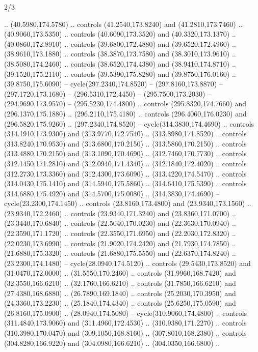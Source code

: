 \begin{flagdescription}{2/3}
\begin{scope}[xshift=0.5\flaglength,yshift=0.5\flagwidth,scale=\stretchfactor]
\begin{scope}[scale=0.001645\flagwidth,yshift=65mm,xshift=-63mm]
\begin{scope}[y=0.80pt, x=0.80pt, yscale=-1,]
\begin{scope}[cm={{1.33333,0.0,0.0,1.33333,(0.0,1e-05)}}]
  .. (40.5980,174.5780) .. controls (41.2540,173.8240) and (41.2810,173.7460) ..
  (40.9060,173.5350) .. controls (40.6090,173.3520) and (40.3320,173.1370) ..
  (40.0860,172.8910) .. controls (39.6800,172.4880) and (39.6520,172.4960) ..
  (38.9610,173.1880) .. controls (38.3870,173.7580) and (38.3010,173.9610) ..
  (38.5080,174.2460) .. controls (38.6520,174.4380) and (38.9410,174.8710) ..
  (39.1520,175.2110) .. controls (39.5390,175.8280) and (39.8750,176.0160) ..
  (39.8750,175.6090) -- cycle(297.2340,174.8520) -- (297.8160,173.8870) --
  (297.1720,173.1680) -- (296.5310,172.4450) -- (295.7500,173.2030) --
  (294.9690,173.9570) -- (295.5230,174.4800) .. controls (295.8320,174.7660) and
  (296.1370,175.1880) .. (296.2110,175.4180) .. controls (296.4060,176.0230) and
  (296.5820,175.9260) .. (297.2340,174.8520) -- cycle(314.3830,174.4690) ..
  controls (314.1910,173.9300) and (313.9770,172.7540) .. (313.8980,171.8520) ..
  controls (313.8240,170.9530) and (313.6800,170.2150) .. (313.5860,170.2150) ..
  controls (313.4880,170.2150) and (313.1090,170.4690) .. (312.7460,170.7730) ..
  controls (312.1450,171.2810) and (312.0940,171.4340) .. (312.1840,172.4020) ..
  controls (312.2730,173.3360) and (312.4300,173.6090) .. (313.4220,174.5470) ..
  controls (314.0430,175.1410) and (314.5940,175.5860) .. (314.6410,175.5390) ..
  controls (314.6880,175.4920) and (314.5700,175.0080) .. (314.3830,174.4690) --
  cycle(23.2300,174.1450) .. controls (23.8160,173.4800) and (23.9340,173.1560)
  .. (23.9340,172.2460) .. controls (23.9340,171.3240) and (23.8360,171.0700) ..
  (23.3440,170.6840) .. controls (22.5040,170.0230) and (22.3630,170.0940) ..
  (22.3590,171.1720) .. controls (22.3550,171.6950) and (22.2030,172.8320) ..
  (22.0230,173.6990) .. controls (21.9020,174.2420) and (21.7930,174.7850) ..
  (21.6880,175.3320) .. controls (21.6880,175.5550) and (22.6370,174.8240) ..
  (23.2300,174.1480) -- cycle(28.0940,174.5120) .. controls (29.5430,173.8520)
  and (31.0470,172.0000) .. (31.5550,170.2460) .. controls (31.9960,168.7420)
  and (32.3550,166.6210) .. (32.1760,166.6210) .. controls (31.7850,166.6210)
  and (27.4380,168.6880) .. (26.7890,169.1840) .. controls (25.2030,170.3950)
  and (24.3360,173.2230) .. (25.1840,174.4340) .. controls (25.6250,175.0590)
  and (26.8160,175.0900) .. (28.0940,174.5080) -- cycle(310.9060,174.4800) ..
  controls (311.4840,173.9060) and (311.4960,172.4530) .. (310.9380,171.2270) ..
  controls (310.3980,170.0470) and (309.1050,168.8160) .. (307.8010,168.2380) ..
  controls (304.8280,166.9220) and (304.0980,166.6210) .. (304.0350,166.6800) ..

\end{scope}
\end{scope}
\end{scope}
\end{scope}
\end{flagdescription}
